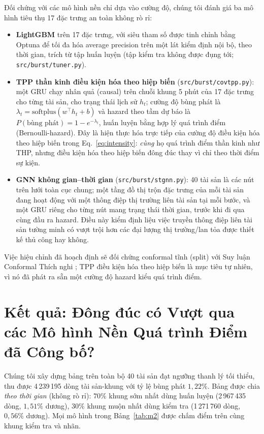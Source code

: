 \documentclass[11pt,a4paper]{article}
\begin{document}
Đối chứng với các mô hình nền chỉ dựa vào cường độ, chúng tôi đánh giá ba mô hình tiêu thụ 17 đặc trưng an toàn không rò rỉ:

\begin{itemize}[nosep]
    \item \textbf{LightGBM} trên 17 đặc trưng, với siêu tham số được tinh chỉnh bằng Optuna để tối đa hóa average precision trên một lát kiểm định nội bộ, theo thời gian, trích từ tập huấn luyện (tập kiểm tra không được đụng tới; \texttt{src/burst/tuner.py}).
    \item \textbf{TPP thần kinh điều kiện hóa theo hiệp biến} (\texttt{src/burst/covtpp.py}): một GRU chạy nhân quả (causal) trên chuỗi khung 5 phút của 17 đặc trưng cho từng tài sản, cho trạng thái lịch sử $h_t$; cường độ bùng phát là $\lambda_t=\text{softplus}(w^\top h_t + b)$ và hazard theo tầm dự báo là $P(\text{bùng phát})=1-e^{-\lambda_t}$, huấn luyện bằng hợp lý quá trình điểm (Bernoulli-hazard). Đây là hiện thực hóa trực tiếp của cường độ điều kiện hóa theo hiệp biến trong Eq.~\eqref{eq:intensity}: \emph{cùng} họ quá trình điểm thần kinh như THP, nhưng điều kiện hóa theo hiệp biến đông đúc thay vì chỉ theo thời điểm sự kiện.
    \item \textbf{GNN không gian--thời gian} (\texttt{src/burst/stgnn.py}): 40 tài sản là các nút trên lưới toàn cục chung; một tầng đồ thị trộn đặc trưng của mỗi tài sản đang hoạt động với một thông điệp thị trường liên tài sản tại mỗi bước, và một GRU riêng cho từng nút mang trạng thái thời gian, trước khi đi qua cùng đầu ra hazard. Điều này kiểm định liệu việc truyền thông điệp liên tài sản tường minh có vượt trội hơn các đại lượng thị trường/lan tỏa được thiết kế thủ công hay không.
\end{itemize}

Việc hiệu chỉnh đã hoạch định sẽ đối chứng conformal tĩnh (split) với Suy luận Conformal Thích nghi \citep{gibbs2021adaptive,zaffran2022adaptive}; TPP điều kiện hóa theo hiệp biến là mục tiêu tự nhiên, vì nó đã phát ra sẵn một cường độ hazard kiểu quá trình điểm.

\section{Kết quả: Đông đúc có Vượt qua các Mô hình Nền Quá trình Điểm đã Công bố?}
\label{sec:results}

Chúng tôi xây dựng bảng trên toàn bộ 40 tài sản đạt ngưỡng thanh lý tối thiểu, thu được 4\,239\,195 dòng tài sản-khung với tỷ lệ bùng phát $1{,}22\%$. Bảng được chia \emph{theo thời gian} (không rò rỉ): $70\%$ khung sớm nhất dùng huấn luyện (2\,967\,435 dòng, $1{,}51\%$ dương), $30\%$ khung muộn nhất dùng kiểm tra (1\,271\,760 dòng, $0{,}56\%$ dương). Mọi mô hình trong Bảng~\ref{tab:m2} được chấm điểm trên cùng khung kiểm tra và nhãn.
\end{document}
